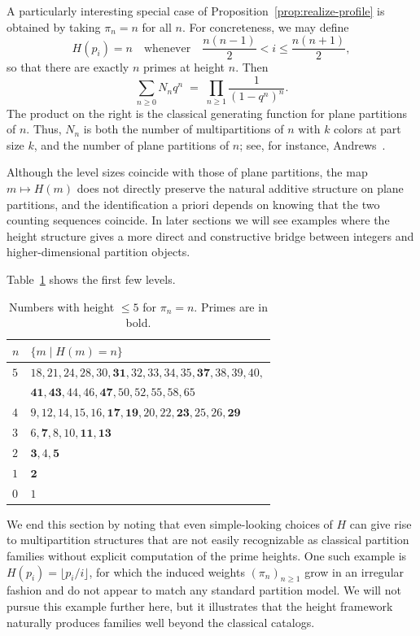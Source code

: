 \documentclass[11pt]{article}
\theoremstyle{definition}
\begin{document}
A particularly interesting special case of
Proposition~\ref{prop:realize-profile} is obtained by taking
$\pi_n=n$ for all $n$.  For concreteness, we may define
\[
  H(p_i)=n
  \quad\text{whenever}\quad
  \frac{n(n-1)}{2} < i \le \frac{n(n+1)}{2},
\]
so that there are exactly $n$ primes at height $n$.  Then
\[
  \sum_{n\ge0} N_n q^n
  \;=\;
  \prod_{n\ge1} \frac{1}{(1-q^n)^n}.
\]
The product on the right is the classical generating function for
plane partitions of $n$.  Thus, \(N_n\) is both the number of multipartitions of \(n\) with \(k\) colors at part size \(k\), and the number of plane partitions
of \(n\); see, for instance, Andrews~\cite{andrews}.

Although the level sizes coincide with those of plane partitions, the
map $m\mapsto H(m)$ does not directly preserve the natural additive
structure on plane partitions, and the identification a priori depends
on knowing that the two counting sequences coincide.  In later
sections we will see examples where the height structure gives a more
direct and constructive bridge between integers and higher-dimensional
partition objects.

Table~\ref{tab:plane} shows the first few levels.

\begin{table}[ht]
\centering
\begin{tabular}{| l | l | }
\hline\hline
$n$ & $\{m\mid H(m)=n\}$\\
\hline
$5$ & $18, 21, 24, 28, 30, \mathbf{31}, 32, 33, 34, 35, \mathbf{37}, 38, 39, 40,$\\
    & $\mathbf{41}, \mathbf{43}, 44, 46, \mathbf{47}, 50, 52, 55, 58, 65 $\\
$4$ & $9, 12, 14, 15, 16, \mathbf{17}, \mathbf{19}, 20, 22, \mathbf{23}, 25, 26, \mathbf{29}$ \\
$3$ & $6, \mathbf{7}, 8, 10, \mathbf{11}, \mathbf{13}$ \\
$2$ & $\mathbf{3}, 4, \mathbf{5}$ \\
$1$ & $\mathbf{2}$ \\
$0$ & $1$ \\
\hline
\end{tabular}
\caption{Numbers with height $\le 5$ for $\pi_n=n$. Primes are in bold.}
\label{tab:plane}
\end{table}

We end this section by noting that even simple-looking choices of $H$
can give rise to multipartition structures that are not easily
recognizable as classical partition families without explicit
computation of the prime heights.  One such example is
$H(p_i)=\lfloor p_i/i\rfloor$, for which the induced weights
$(\pi_n)_{n\ge1}$ grow in an irregular fashion and do not appear to
match any standard partition model.  We will not pursue this example
further here, but it illustrates that the height framework naturally
produces families well beyond the classical catalogs.
\end{document}
